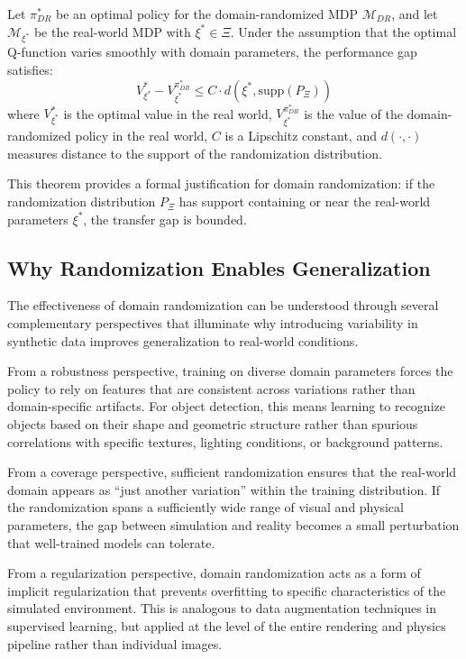 \begin{theorem}
\label{thm:dr_transfer}
Let $\pi^*_{DR}$ be an optimal policy for the domain-randomized MDP $\mathcal{M}_{DR}$, and let $\mathcal{M}_{\xi^*}$ be the real-world MDP with $\xi^* \in \Xi$. Under the assumption that the optimal Q-function varies smoothly with domain parameters, the performance gap satisfies:
\begin{equation}
V^*_{\xi^*} - V^{\pi^*_{DR}}_{\xi^*} \leq C \cdot d(\xi^*, \text{supp}(P_\Xi))
\end{equation}
where $V^*_{\xi^*}$ is the optimal value in the real world, $V^{\pi^*_{DR}}_{\xi^*}$ is the value of the domain-randomized policy in the real world, $C$ is a Lipschitz constant, and $d(\cdot, \cdot)$ measures distance to the support of the randomization distribution.
\end{theorem}

This theorem provides a formal justification for domain randomization: if the randomization distribution $P_\Xi$ has support containing or near the real-world parameters $\xi^*$, the transfer gap is bounded.

\subsection{Why Randomization Enables Generalization}
\label{subsec:why_randomization}

The effectiveness of domain randomization can be understood through several complementary perspectives that illuminate why introducing variability in synthetic data improves generalization to real-world conditions.

From a robustness perspective, training on diverse domain parameters forces the policy to rely on features that are consistent across variations rather than domain-specific artifacts. For object detection, this means learning to recognize objects based on their shape and geometric structure rather than spurious correlations with specific textures, lighting conditions, or background patterns.

From a coverage perspective, sufficient randomization ensures that the real-world domain appears as ``just another variation'' within the training distribution. If the randomization spans a sufficiently wide range of visual and physical parameters, the gap between simulation and reality becomes a small perturbation that well-trained models can tolerate.

From a regularization perspective, domain randomization acts as a form of implicit regularization that prevents overfitting to specific characteristics of the simulated environment. This is analogous to data augmentation techniques in supervised learning, but applied at the level of the entire rendering and physics pipeline rather than individual images.

